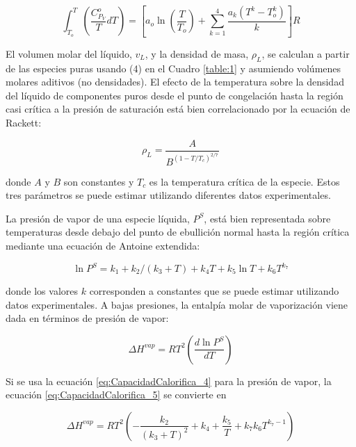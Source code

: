 \documentclass[11pt]{book}
\begin{document}
\begin{equation}
    \label{eq:CapacidadCalorifica_3}
    \int_{T_o}^T \left( \frac{C_{P_V}^o}{T} dT \right) = \left[ a_o \ln \left( \frac{T}{T_o} \right) + \sum_{k=1}^{4} \frac{a_k (T^k - T_o^k)}{k} \right] R
\end{equation}

El volumen molar del líquido, $v_L$, y la densidad de masa, $\rho_L$, se calculan a partir de las especies puras usando (4) en el Cuadro \ref{table:1} y asumiendo volúmenes molares aditivos (no densidades). El efecto de la temperatura sobre la densidad del líquido de componentes puros desde el punto de congelación hasta la región casi crítica a la presión de saturación está bien correlacionado por la ecuación de Rackett:

\begin{equation}
    \label{eq:CapacidadCalorifica_4}
    \rho_L = \frac{A}{B^{(1-T/T_c)^{2/7}}}
\end{equation}

donde $A$ y $B$ son constantes y $T_c$ es la temperatura crítica de la especie. Estos tres parámetros se puede estimar utilizando diferentes datos experimentales.

La presión de vapor de una especie líquida, $P^S$, está bien representada sobre temperaturas desde debajo del punto de ebullición normal hasta la región crítica mediante una ecuación de Antoine extendida:

\begin{equation}
    \label{eq:CapacidadCalorifica_5}
    \ln P^S = k_1 + k_2/(k_3 + T) + k_4 T + k_5 \ln T + k_6 T^{k_7}
\end{equation}

donde los valores $k$ corresponden a constantes que se puede estimar utilizando datos experimentales. A bajas presiones, la entalpía molar de vaporización viene dada en términos de presión de vapor:

\begin{equation}
    \label{eq:CapacidadCalorifica_6}
    \Delta H^{vap} = RT^2 \left( \frac{d \ln P^S}{dT} \right)
\end{equation}

Si se usa la ecuación \ref{eq:CapacidadCalorifica_4} para la presión de vapor, la ecuación \ref{eq:CapacidadCalorifica_5} se convierte en

\begin{equation}
    \label{eq:CapacidadCalorifica_7}
    \Delta H^{vap} = RT^2 \left( - \frac{k_2}{(k_3 + T)^2} + k_4 + \frac{k_5}{T} + k_7 k_6 T^{k_7-1} \right)
\end{equation}
\end{document}
